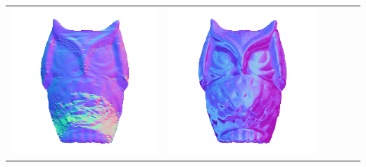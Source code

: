 \begin{tabularx}{\linewidth}{@{}Y@{}Y@{}Y@{}Y@{}Y@{}Y@{}}
\includegraphics[width=\linewidth]{semisynthetic/20150514_15_yu_out.png} &
\includegraphics[width=\linewidth]{semisynthetic/20150514_15_dpsn_out.png} &

\end{tabularx}
